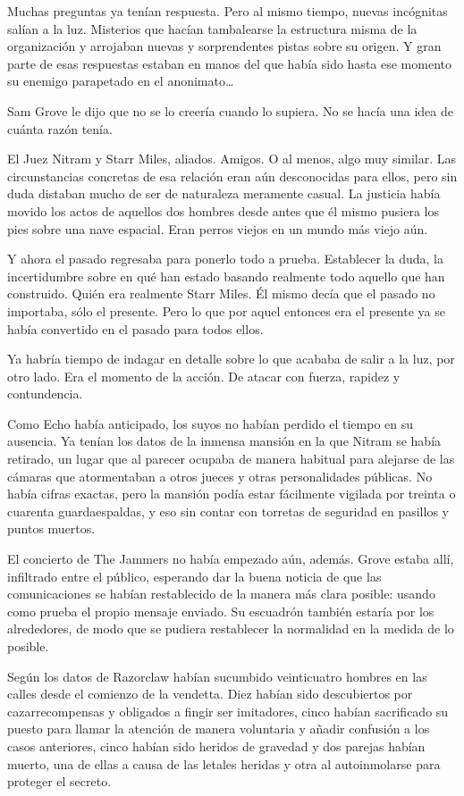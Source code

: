 Muchas preguntas ya tenían respuesta. Pero al mismo tiempo, nuevas incógnitas salían a la luz. Misterios que hacían tambalearse la estructura misma de la organización y arrojaban nuevas y sorprendentes pistas sobre su origen.
Y gran parte de esas respuestas estaban en manos del que había sido hasta ese momento su enemigo parapetado en el anonimato\dots

\fancyparbreak
Sam Grove le dijo que no se lo creería cuando lo supiera. No se hacía una idea de cuánta razón tenía.

El Juez Nitram y Starr Miles, aliados. Amigos. O al menos, algo muy similar. Las circunstancias concretas de esa relación eran aún desconocidas para ellos, pero sin duda distaban mucho de ser de naturaleza meramente casual. La justicia había movido los actos de aquellos dos hombres desde antes que él mismo pusiera los pies sobre una nave espacial. Eran perros viejos en un mundo más viejo aún.

Y ahora el pasado regresaba para ponerlo todo a prueba. Establecer la duda, la incertidumbre sobre en qué han estado basando realmente todo aquello que han construido. Quién era realmente Starr Miles. Él mismo decía que el pasado no importaba, sólo el presente. Pero lo que por aquel entonces era el presente ya se había convertido en el pasado para todos ellos.

Ya habría tiempo de indagar en detalle sobre lo que acababa de salir a la luz, por otro lado. Era el momento de la acción. De atacar con fuerza, rapidez y contundencia.

Como Echo había anticipado, los suyos no habían perdido el tiempo en su ausencia. Ya tenían los datos de la inmensa mansión en la que Nitram se había retirado, un lugar que al parecer ocupaba de manera habitual para alejarse de las cámaras que atormentaban a otros jueces y otras personalidades públicas. No había cifras exactas, pero la mansión podía estar fácilmente vigilada por treinta o cuarenta guardaespaldas, y eso sin contar con torretas de seguridad en pasillos y puntos muertos.

El concierto de The Jammers no había empezado aún, además. Grove estaba allí, infiltrado entre el público, esperando dar la buena noticia de que las comunicaciones se habían restablecido de la manera más clara posible: usando como prueba el propio mensaje enviado. Su escuadrón también estaría por los alrededores, de modo que se pudiera restablecer la normalidad en la medida de lo posible.

Según los datos de Razorclaw habían sucumbido veinticuatro hombres en las calles desde el comienzo de la vendetta. Diez habían sido descubiertos por cazarrecompensas y obligados a fingir ser imitadores, cinco habían sacrificado su puesto para llamar la atención de manera voluntaria y añadir confusión a los casos anteriores, cinco habían sido heridos de gravedad y dos parejas habían muerto, una de ellas a causa de las letales heridas y otra al autoinmolarse para proteger el secreto.

